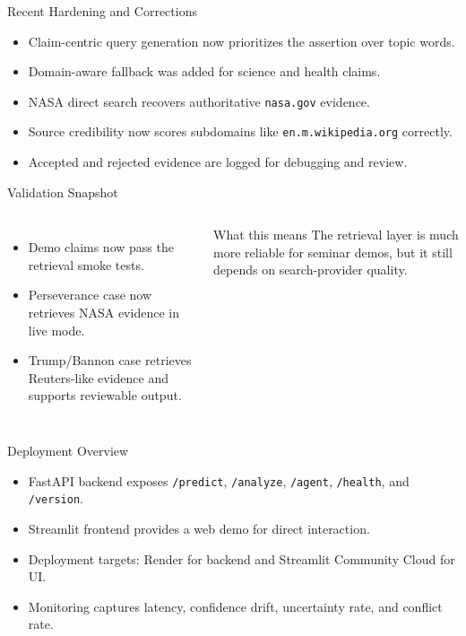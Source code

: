 \documentclass[aspectratio=169]{beamer}
\begin{document}
\begin{frame}{Recent Hardening and Corrections}
  \begin{itemize}
    \item Claim-centric query generation now prioritizes the assertion over topic words.
    \item Domain-aware fallback was added for science and health claims.
    \item NASA direct search recovers authoritative \texttt{nasa.gov} evidence.
    \item Source credibility now scores subdomains like \texttt{en.m.wikipedia.org} correctly.
    \item Accepted and rejected evidence are logged for debugging and review.
  \end{itemize}
\end{frame}

\begin{frame}{Validation Snapshot}
  \begin{columns}[T,onlytextwidth]
    \begin{itemize}
      \item Demo claims now pass the retrieval smoke tests.
      \item Perseverance case now retrieves NASA evidence in live mode.
      \item Trump/Bannon case retrieves Reuters-like evidence and supports reviewable output.
    \end{itemize}
    \begin{block}{What this means}
      The retrieval layer is much more reliable for seminar demos, but it still depends on search-provider quality.
    \end{block}
  \end{columns}
\end{frame}

\begin{frame}{Deployment Overview}
  \begin{itemize}
    \item FastAPI backend exposes \texttt{/predict}, \texttt{/analyze}, \texttt{/agent}, \texttt{/health}, and \texttt{/version}.
    \item Streamlit frontend provides a web demo for direct interaction.
    \item Deployment targets: Render for backend and Streamlit Community Cloud for UI.
    \item Monitoring captures latency, confidence drift, uncertainty rate, and conflict rate.
  \end{itemize}
\end{frame}
\end{document}
